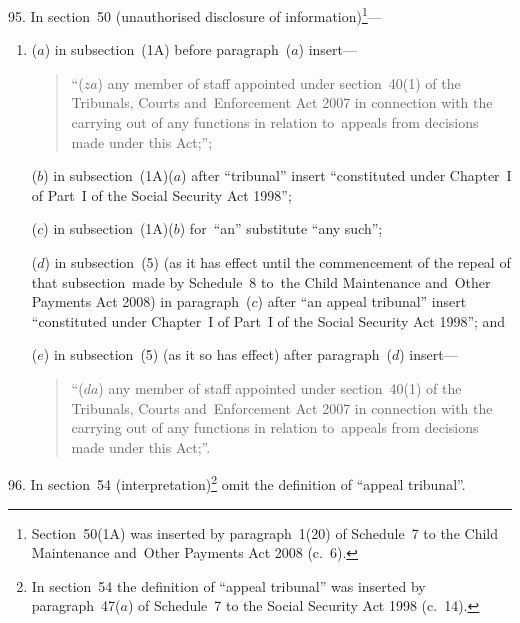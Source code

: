 \documentclass[12pt,a4paper]{article}
\begin{document}
95.  In section~50 (unauthorised disclosure of information)\footnote{Section~50(1A) was inserted by paragraph~1(20) of Schedule~7 to the Child Maintenance and~Other Payments Act 2008 (c.~6).}—
\begin{enumerate}\item[]
($a$) in subsection~(1A) before paragraph~($a$)  insert—
\begin{quotation}
“($za$) any member of staff appointed under section~40(1) of the Tribunals, Courts and~Enforcement Act 2007 in connection with the carrying out of any functions in relation to~appeals from decisions made under this Act;”;
\end{quotation}

($b$) in subsection~(1A)($a$)  after “tribunal” insert “constituted under Chapter~I of Part~I of the Social Security Act 1998”;

($c$) in subsection~(1A)($b$)  for~“an” substitute “any such”;

($d$) in subsection~(5) (as it has effect until the commencement of the repeal of that subsection~made by Schedule~8 to~the Child Maintenance and~Other Payments Act 2008) in paragraph~($c$)  after “an appeal tribunal” insert “constituted under Chapter~I of Part~I of the Social Security Act 1998”; and

($e$) in subsection~(5) (as it so has effect) after paragraph~($d$)  insert—
\begin{quotation}
“($da$) any member of staff appointed under section~40(1) of the Tribunals, Courts and~Enforcement Act 2007 in connection with the carrying out of any functions in relation to~appeals from decisions made under this Act;”.
\end{quotation}
\end{enumerate}

\medskip

96.  In section~54 (interpretation)\footnote{In section~54 the definition of “appeal tribunal” was inserted by paragraph~47($a$) of Schedule~7 to the Social Security Act 1998 (c.~14).} omit the definition of “appeal tribunal”.

\medskip
\end{document}
